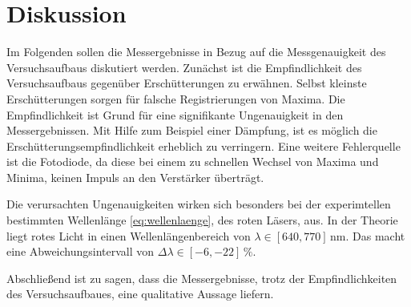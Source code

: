 \section{Diskussion}
Im Folgenden sollen die Messergebnisse in Bezug auf die Messgenauigkeit des
Versuchsaufbaus diskutiert werden.
Zunächst ist die Empfindlichkeit des Versuchsaufbaus gegenüber Erschütterungen %
zu erwähnen. Selbst kleinste Erschütterungen sorgen für falsche Registrierungen von %
Maxima. Die Empfindlichkeit ist Grund für eine signifikante Ungenauigkeit in den
Messergebnissen. Mit Hilfe zum Beispiel einer Dämpfung, ist es möglich die %
Erschütterungsempfindlichkeit erheblich zu verringern. %
Eine weitere Fehlerquelle ist die Fotodiode, da diese bei einem zu schnellen
Wechsel von Maxima und Minima, keinen Impuls an den Verstärker überträgt.

Die verursachten Ungenauigkeiten wirken sich besonders bei der experimtellen bestimmten
Wellenlänge \eqref{eq:wellenlaenge}, des roten Läsers, aus.
In der Theorie liegt rotes Licht in einen Wellenlängenbereich von
$\lambda \in \left[640,770\right]\,\si{\nano\meter}$\cite{tafelwerk}.
Das macht eine Abweichungsintervall von $\Delta \lambda \in \left[-6, -22 \right]\,\%$.

Abschließend ist zu sagen, dass die Messergebnisse, trotz der Empfindlichkeiten
des Versuchsaufbaues, eine qualitative Aussage liefern.

